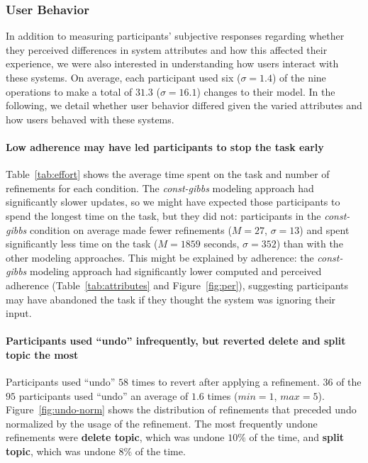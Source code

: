 \subsubsection{User Behavior}
In addition to measuring participants' subjective responses regarding whether they perceived differences in system attributes and how this affected their experience, we were also interested in understanding how users interact with these systems. On average, each participant used six ($\sigma=1.4$) of the nine operations to make a total of $31.3$ ($\sigma=16.1$) changes to their model. In the following, we detail whether user behavior differed given the varied attributes and how users behaved with these systems.

\paragraph{Low adherence may have led participants to stop the task early}
Table~\ref{tab:effort} shows the average time spent on the task and number of refinements for each condition.
The \textit{const-gibbs} modeling approach had significantly slower updates, so we might have expected those participants to spend the longest time on the task, but they did not: participants in the \textit{const-gibbs} condition on
average made fewer refinements ($M=27$, $\sigma=13$) and spent significantly less
time on the task ($M=1859$ seconds, $\sigma=352$) than with the other modeling approaches. This might be explained by adherence: the \textit{const-gibbs} modeling approach had significantly lower computed and perceived adherence (Table~\ref{tab:attributes} and Figure~\ref{fig:per}), suggesting participants may have abandoned the task if they thought the system was ignoring their input.

\paragraph{Participants used ``undo'' infrequently, but reverted delete and split topic the most}

Participants used ``undo'' $58$ times to revert after applying a refinement. $36$ of the $95$ participants used ``undo'' an average of $1.6$ times ($min=1$, $max=5$). Figure~\ref{fig:undo-norm} shows the distribution of refinements that preceded undo normalized by the usage of the refinement. The most frequently undone refinements were \textbf{delete topic}, which was undone $10\%$ of the time, and \textbf{split topic}, which was undone $8\%$ of the time.

